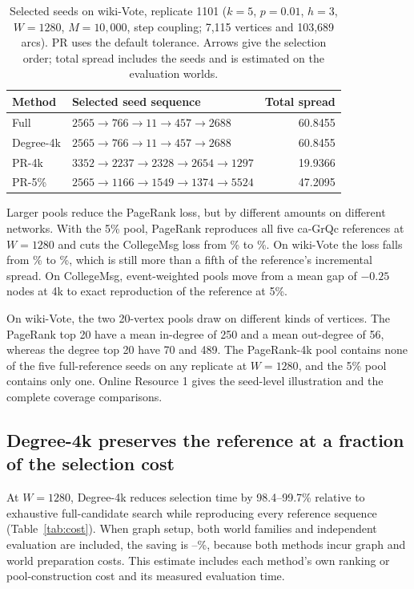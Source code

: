 \documentclass[smallextended]{svjour3}
\begin{document}
\begin{table}[htbp]
\caption{Selected seeds on wiki-Vote, replicate 1101 ($k=5$, $p=0.01$, $h=3$, $W=1280$, $M=10{,}000$, step coupling; 7,115 vertices and 103,689 arcs). PR uses the default tolerance. Arrows give the selection order; total spread includes the seeds and is estimated on the evaluation worlds.}\label{tab:case}
\begin{tabularx}{\linewidth}{lXr}\toprule
Method & Selected seed sequence & Total spread \\ \midrule
Full & $2565\to 766\to 11\to 457\to 2688$ & 60.8455 \\
Degree-4k & $2565\to 766\to 11\to 457\to 2688$ & 60.8455 \\
PR-4k & $3352\to 2237\to 2328\to 2654\to 1297$ & 19.9366 \\
PR-5\% & $2565\to 1166\to 1549\to 1374\to 5524$ & 47.2095 \\
\bottomrule\end{tabularx}
\end{table}

Larger pools reduce the PageRank loss, but by different amounts on different networks. With the 5\% pool, PageRank reproduces all five ca-GrQc references at $W=1280$ and cuts the CollegeMsg loss from \CollegePRLoss{}\% to \CollegePRfiveLoss{}\%. On wiki-Vote the loss falls from \WikiPRLoss{}\% to \WikiPRfiveLoss{}\%, which is still more than a fifth of the reference's incremental spread. On CollegeMsg, event-weighted pools move from a mean gap of $-0.25$ nodes at 4k to exact reproduction of the reference at 5\%.

On wiki-Vote, the two 20-vertex pools draw on different kinds of vertices. The PageRank top 20 have a mean in-degree of 250 and a mean out-degree of 56, whereas the degree top 20 have 70 and 489. The PageRank-4k pool contains none of the five full-reference seeds on any replicate at $W=1280$, and the 5\% pool contains only one. Online Resource 1 gives the seed-level illustration and the complete coverage comparisons.

\subsection{Degree-4k preserves the reference at a fraction of the selection cost}
At $W=1280$, Degree-4k reduces selection time by 98.4--99.7\% relative to exhaustive full-candidate search while reproducing every reference sequence (Table~\ref{tab:cost}). When graph setup, both world families and independent evaluation are included, the saving is \CollegeDegreeSaving{}--\WikiDegreeSaving{}\%, because both methods incur graph and world preparation costs. This estimate includes each method's own ranking or pool-construction cost and its measured evaluation time.
\end{document}
